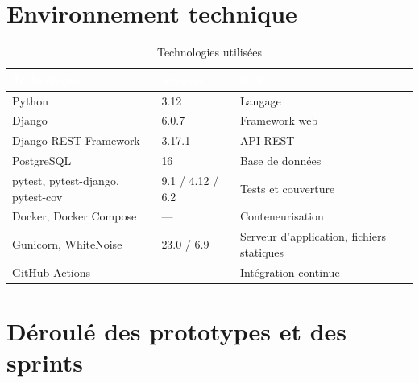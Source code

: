 \documentclass[11pt,a4paper]{report}
\newcommand{\entete}{\rowcolor{primaire}}
\newcommand{\tete}[1]{\textcolor{white}{\textbf{#1}}}
\begin{document}
\section{Environnement technique}

\begin{table}[H]
\centering
\caption{Technologies utilisées}
\begin{tabularx}{\linewidth}{@{}p{4.4cm}p{2.4cm}Y@{}}
\toprule
\entete \tete{Technologie} & \tete{Version} & \tete{Rôle} \\
\midrule
Python & 3.12 & Langage \\
Django & 6.0.7 & Framework web \\
Django REST Framework & 3.17.1 & API REST \\
PostgreSQL & 16 & Base de données \\
pytest, pytest-django, pytest-cov & 9.1 / 4.12 / 6.2 & Tests et couverture \\
Docker, Docker Compose & --- & Conteneurisation \\
Gunicorn, WhiteNoise & 23.0 / 6.9 & Serveur d'application, fichiers statiques \\
GitHub Actions & --- & Intégration continue \\
\bottomrule
\end{tabularx}
\end{table}

\section{Déroulé des prototypes et des sprints}
\end{document}
